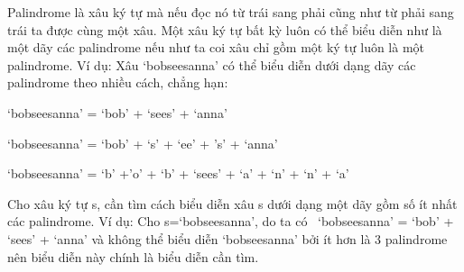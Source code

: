 Palindrome là xâu ký tự mà nếu đọc nó từ trái sang phải cũng như từ phải sang trái ta được cùng một xâu. Một xâu ký tự bất kỳ luôn có thể biểu diễn như là một dãy các palindrome nếu như ta coi xâu chỉ gồm một ký tự luôn là một palindrome. Ví dụ: Xâu ‘bobseesanna’ có thể biểu diễn dưới dạng dãy các palindrome theo nhiều cách, chẳng hạn:  

   ‘bobseesanna’ = ‘bob’ + ‘sees’ + ‘anna’  

   ‘bobseesanna’ = ‘bob’ + ‘s’ + ‘ee’ + ’s’ + ‘anna’  

   ‘bobseesanna’ = ‘b’ +’o’ + ‘b’ + ‘sees’ + ‘a’ + ‘n’ + ‘n’ + ‘a’  

Cho xâu ký tự s, cần tìm cách biểu diễn xâu s dưới dạng một dãy gồm số ít nhất các palindrome. Ví dụ: Cho s=‘bobseesanna’, do ta có  ‘bobseesanna’ = ‘bob’ + ‘sees’ + ‘anna’ và không thể biểu diễn ‘bobseesanna’ bởi ít hơn là 3 palindrome nên biểu diễn này chính là biểu diễn cần tìm.
